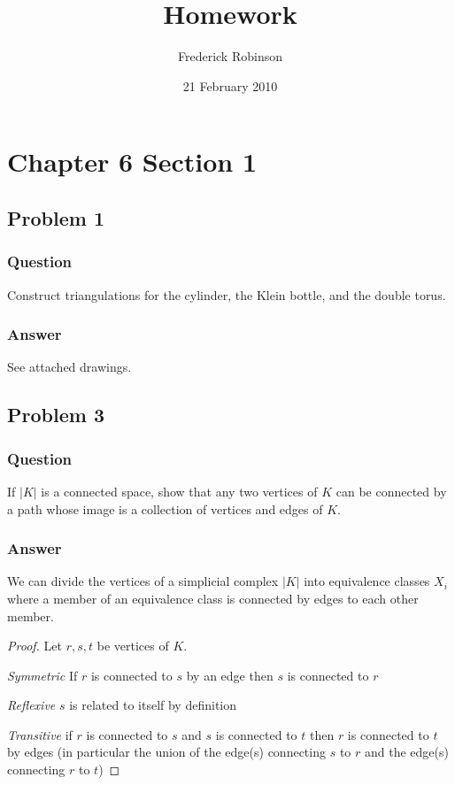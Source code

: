 \documentclass[10pt]{article}
\title{Homework}
\author{Frederick Robinson}
\date{21 February 2010}
\begin{document}

   \maketitle



\section{Chapter 6 Section 1}

\subsection{Problem 1}

\subsubsection{Question}
Construct triangulations for the cylinder, the Klein bottle, and the double torus.
\subsubsection{Answer}
See attached drawings.

\subsection{Problem 3}

\subsubsection{Question}
If $|K|$ is a connected space, show that any two vertices of $K$ can be connected by a path whose image is a collection of vertices and edges of $K$.
\subsubsection{Answer}
We can divide the vertices of a simplicial complex $|K|$ into equivalence classes $X_i$ where a member of an equivalence class is connected by edges to each other member.

\begin{proof}
Let $r, s, t$ be vertices of $K$.

\emph{Symmetric}
If $r$ is connected to  $s$ by an edge then $s$ is connected to $r$

\emph{Reflexive }
$s$ is related to itself by definition

\emph{Transitive}
if $r$ is connected to $s$ and $s$ is connected to $t$ then $r$ is connected to $t$ by edges  (in particular the union of the edge(s) connecting $s$ to $r$ and the edge(s) connecting $r$ to $t$)

\end{proof}
\end{document}
